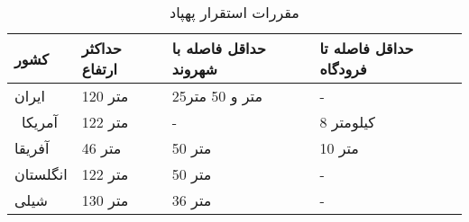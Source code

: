 	\begin{table}\caption{مقررات استقرار پهپاد}\label{Table1}
	\begin{tabular}{llll}
		\hline
		کشور& حداکثر ارتفاع & حداقل فاصله با شهروند & حداقل فاصله تا فرودگاه \\ \hline
		ایران & 120 متر & 25متر و 50 متر & -  \\ \
		آمریکا & 122 متر & - & 8 کیلومتر \\ 
		آفریقا & 46 متر & 50 متر & 10 متر \\ 
		انگلستان & 122 متر & 50 متر & - \\ 
		شیلی & 130 متر & 36 متر & - \\ \hline
	\end{tabular}
\end{table}